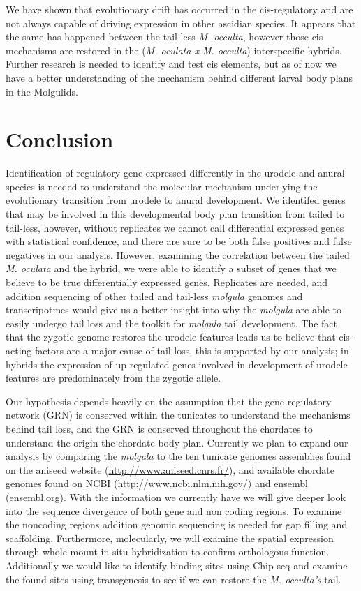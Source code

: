 We have shown that evolutionary drift has occurred in the cis-regulatory and are not always capable of driving expression in other ascidian species. It appears that the same has happened between the tail-less \textit{M. occulta}, however those cis mechanisms are restored in the (\textit{M. oculata x M. occulta}) interspecific hybrids. Further research is needed to identify and test cis elements, but as of now we have a better understanding of the mechanism behind different larval body plans in the Molgulids. 

\section{Conclusion}

Identification of regulatory gene expressed differently in the urodele and anural species is needed to understand the molecular mechanism underlying the evolutionary transition from urodele to anural development. We identifed genes that may be involved in this developmental body plan transition from tailed to tail-less, however, without replicates we cannot call differential expressed genes with statistical confidence, and there are sure to be both false positives and false negatives in our analysis. However, examining the correlation between the tailed \textit{M. oculata} and the hybrid, we were able to identify a subset of genes that we believe to be true differentially expressed genes. Replicates are needed, and addition sequencing of other tailed and tail-less \textit{molgula} genomes and transcripotmes would give us a better insight into why the \textit{molgula} are able to easily undergo tail loss and the toolkit for \textit{molgula} tail development. The fact that the zygotic genome restores the urodele features leads us to believe that cis-acting factors are a major cause of tail loss, this is supported by our analysis; in hybrids the expression of up-regulated genes involved in development of urodele features are predominately from the zygotic allele.

Our hypothesis depends heavily on the assumption that the gene regulatory network (GRN) is conserved within the tunicates to understand the mechanisms behind tail loss, and the GRN is conserved throughout the chordates to understand the origin the chordate body plan. Currently we plan to expand our analysis by comparing the \textit{molgula} to the ten tunicate genomes assemblies found on the aniseed website (\url{http://www.aniseed.cnrs.fr/}), and available chordate genomes found on NCBI (\url{http://www.ncbi.nlm.nih.gov/}) and ensembl (\url{ensembl.org}). With the information we currently have we will give deeper look into the sequence divergence of both gene and non coding regions. To examine the noncoding regions addition genomic sequencing is needed for gap filling and scaffolding. Furthermore, molecularly, we will examine the spatial expression through whole mount in situ hybridization to confirm orthologous function.  Additionally we would like to identify binding sites using Chip-seq and examine the found sites using transgenesis to see if we can restore the \textit{M. occulta's} tail.

